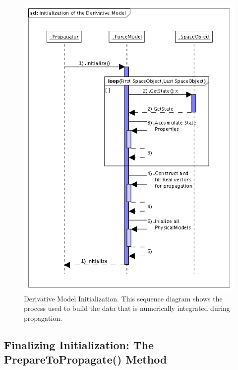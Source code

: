 \begin{figure}[htb]
\begin{center}
\includegraphics[235,321]{Images/InitializationoftheDerivativeModel.png}
\caption[Derivative Model Initialization]{\label{figure:DerivativeModelInitialization}Derivative
Model Initialization.  This sequence diagram shows the process used to build the data that is
numerically integrated during propagation.}
\end{center}
\end{figure}


\subsection{Finalizing Initialization: The PrepareToPropagate() Method}

